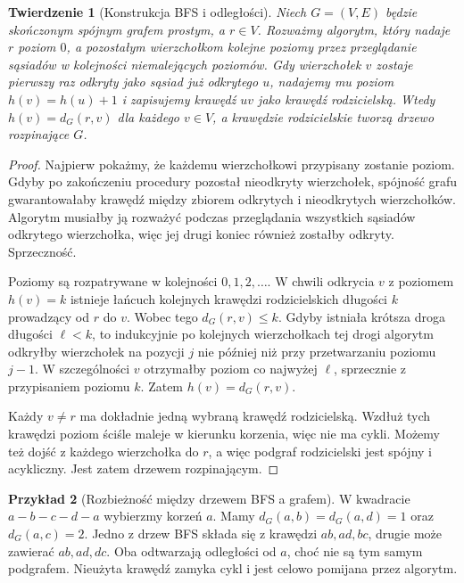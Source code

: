 \documentclass[11pt,a4paper]{report}
\numberwithin{equation}{section}
\theoremstyle{plain}
\newtheorem{twierdzenie}{Twierdzenie}[section]
\theoremstyle{definition}
\newtheorem{przyklad}[twierdzenie]{Przykład}
\theoremstyle{remark}
\begin{document}
\begin{twierdzenie}[Konstrukcja BFS i odległości]
Niech $G=(V,E)$ będzie skończonym spójnym
grafem prostym, a $r\in V$. Rozważmy algorytm,
który nadaje $r$ poziom $0$, a pozostałym
wierzchołkom kolejne poziomy przez przeglądanie
sąsiadów w kolejności niemalejących poziomów.
Gdy wierzchołek $v$ zostaje pierwszy raz
odkryty jako sąsiad już odkrytego $u$,
nadajemy mu poziom $h(v)=h(u)+1$ i zapisujemy
krawędź $uv$ jako krawędź rodzicielską.
Wtedy $h(v)=d_G(r,v)$ dla każdego $v\in V$,
a krawędzie rodzicielskie tworzą drzewo
rozpinające $G$.
\end{twierdzenie}

\begin{proof}
Najpierw pokażmy, że każdemu wierzchołkowi
przypisany zostanie poziom. Gdyby po zakończeniu
procedury pozostał nieodkryty wierzchołek,
spójność grafu gwarantowałaby krawędź między
zbiorem odkrytych i nieodkrytych wierzchołków.
Algorytm musiałby ją rozważyć podczas
przeglądania wszystkich sąsiadów odkrytego
wierzchołka, więc jej drugi koniec również
zostałby odkryty. Sprzeczność.

Poziomy są rozpatrywane w kolejności $0,1,2,\ldots$.
W chwili odkrycia $v$ z poziomem $h(v)=k$
istnieje łańcuch kolejnych krawędzi
rodzicielskich długości $k$ prowadzący od $r$
do $v$. Wobec tego $d_G(r,v)\le k$.
Gdyby istniała krótsza droga długości $\ell<k$,
to indukcyjnie po kolejnych wierzchołkach tej
drogi algorytm odkryłby wierzchołek na pozycji
$j$ nie później niż przy przetwarzaniu poziomu
$j-1$. W szczególności $v$ otrzymałby poziom
co najwyżej $\ell$, sprzecznie z przypisaniem
poziomu $k$. Zatem $h(v)=d_G(r,v)$.

Każdy $v\ne r$ ma dokładnie jedną wybraną
krawędź rodzicielską. Wzdłuż tych krawędzi
poziom ściśle maleje w kierunku korzenia,
więc nie ma cykli. Możemy też dojść z
każdego wierzchołka do $r$, a więc podgraf
rodzicielski jest spójny i acykliczny.
Jest zatem drzewem rozpinającym.
\end{proof}

\begin{przyklad}[Rozbieżność między drzewem BFS a grafem]
W kwadracie $a-b-c-d-a$ wybierzmy korzeń $a$.
Mamy $d_G(a,b)=d_G(a,d)=1$ oraz $d_G(a,c)=2$.
Jedno z drzew BFS składa się z krawędzi
$ab,ad,bc$, drugie może zawierać $ab,ad,dc$.
Oba odtwarzają odległości od $a$, choć
nie są tym samym podgrafem. Nieużyta krawędź
zamyka cykl i jest celowo pomijana przez algorytm.
\end{przyklad}
\end{document}
